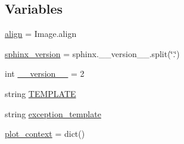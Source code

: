 \subsection*{Variables}
\begin{DoxyCompactItemize}
\item 
\mbox{\hyperlink{namespaceplot__directive_a97178aa7d4f235191ba2e092694e4c21}{align}} = Image.\+align
\item 
\mbox{\hyperlink{namespaceplot__directive_ad857e636d78cbb0bea5fd65ecd669836}{sphinx\+\_\+version}} = sphinx.\+\_\+\+\_\+version\+\_\+\+\_\+.\+split(\char`\"{}.\char`\"{})
\item 
int \mbox{\hyperlink{namespaceplot__directive_a88acf135f41dd97c19461189de4702b2}{\+\_\+\+\_\+version\+\_\+\+\_\+}} = 2
\item 
string \mbox{\hyperlink{namespaceplot__directive_a5e5b8b46a953e7b8e757db62a0ca982e}{T\+E\+M\+P\+L\+A\+TE}}
\item 
string \mbox{\hyperlink{namespaceplot__directive_a03886cab299b8427f005cfca49480a55}{exception\+\_\+template}}
\item 
\mbox{\hyperlink{namespaceplot__directive_af1a93d87bd3aabebcdc80fbed20be98c}{plot\+\_\+context}} = dict()
\end{DoxyCompactItemize}


